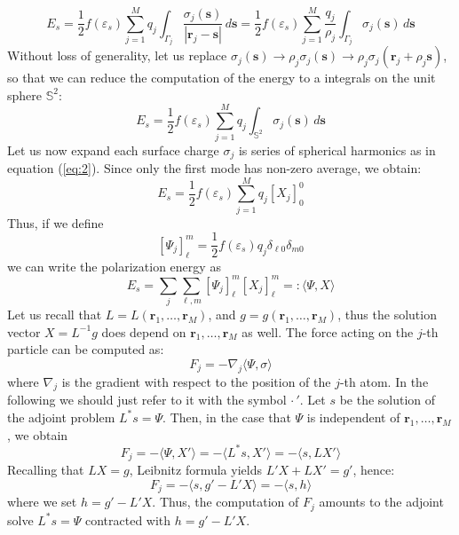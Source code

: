 \documentclass[12pt,letterpaper,oneside]{article}
\theoremstyle{definition}
\begin{document}
\[
E_s = \frac{1}{2} f(\varepsilon_s) \sum_{j=1}^M q_j \int_{\Gamma_j} \frac{\sigma_j(\boldsymbol{s})}{| \boldsymbol{r}_j -  \boldsymbol{s} |} \, d \boldsymbol{s} = \frac{1}{2} f(\varepsilon_s) \sum_{j=1}^M \frac{q_j}{\rho_j} \int_{\Gamma_j} \sigma_j(\boldsymbol{s}) \, d \boldsymbol{s}
\]
Without loss of generality, let us replace $\sigma_j (\boldsymbol{s}) \to \rho_j \sigma_j (\boldsymbol{s}) \to \rho_j \sigma_j (\boldsymbol{r}_j + \rho_j \boldsymbol{s})$, so that we can reduce the computation of the energy to a integrals on the unit sphere $\mathbb{S}^2$:
\[
E_s = \frac{1}{2} f(\varepsilon_s) \sum_{j=1}^M q_j \int_{\mathbb{S}^2} \sigma_j(\boldsymbol{s}) \, d \boldsymbol{s}
\]
Let us now expand each surface charge $\sigma_j$ is series of spherical harmonics as in equation (\ref{eq:2}). Since only the first mode has non-zero average, we obtain:
\[
E_s = \frac{1}{2} f(\varepsilon_s) \sum_{j=1}^M q_j [X_j]_0^0
\]
Thus, if we define
\[
[\Psi_j]_\ell^m =  \frac{1}{2} f(\varepsilon_s) q_j \delta_{\ell 0} \delta_{m 0}
\]
%
%
%
we can write the polarization energy as
\[
E_s =  \sum_j \sum_{\ell,m} [\Psi_j]_\ell^m [X_j]_\ell^m =: \langle \Psi, X \rangle
\]
Let us recall that $L = L(\boldsymbol{r}_1, \ldots , \boldsymbol{r}_M)$, and $g = g(\boldsymbol{r}_1, \ldots , \boldsymbol{r}_M)$, thus the solution vector $X = L^{-1} g$ does depend on $\boldsymbol{r}_1, \ldots , \boldsymbol{r}_M$ as well. The force acting on the $j$-th particle can be computed as:
\[
F_j = -\nabla_j \langle \Psi, \sigma \rangle %
\]
where $\nabla_j$ is the gradient with respect to the position of the $j$-th atom. In the following we should just refer to it with the symbol $\cdot\,'$. Let $s$ be the solution of the adjoint problem $L^*s = \Psi$. Then, in the case that $\Psi$ is independent of $\boldsymbol{r}_1, \ldots , \boldsymbol{r}_M$, we obtain
\[
F_j = - \langle \Psi, X' \rangle = - \langle L^*s, X' \rangle = - \langle s, L X' \rangle
\]
Recalling that $LX = g$, Leibnitz formula yields $L'X + L X' = g'$, hence:
\[
F_j = -\langle s , g' - L' X \rangle = - \langle s , h \rangle
\]
where we set $h = g' - L' X$. Thus, the computation of $F_j$ amounts to the adjoint solve $L^*s = \Psi$ contracted with $h = g' - L' X$.
\end{document}
